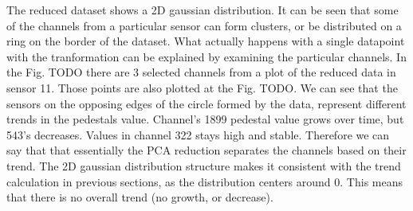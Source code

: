 The reduced dataset shows a 2D gaussian distribution. It can be seen that some of the channels from a particular sensor can form clusters, or be distributed on a ring on the border of the dataset. What actually happens with a single datapoint with the tranformation can be explained by examining the particular channels. In the Fig. TODO there are 3 selected channels from a plot of the reduced data in sensor 11. Those points are also plotted at the Fig. TODO. We can see that the sensors on the opposing edges of the circle formed by the data, represent different trends in the pedestals value. Channel's 1899 pedestal value grows over time, but 543's decreases. Values in channel 322 stays high and stable. Therefore we can say that that essentially the PCA reduction separates the channels based on their trend. The 2D gaussian distribution structure makes it consistent with the trend calculation in previous sections, as the distribution centers around 0. This means that there is no overall trend (no growth, or decrease).
  
